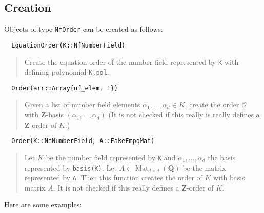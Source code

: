 \documentclass[a4paper,10pt]{article}
\newcommand{\Z}{\mathbf{Z}}
\newcommand{\Q}{\mathbf{Q}}
\newcommand{\code}{\lstinline}
\newcommand{\desc}[1]{\vspace{-3mm}\begin{quote}#1\end{quote}}
\newcommand{\Mat}{\operatorname{Mat}}
\begin{document}
\subsection{Creation}

Objects of type \code{NfOrder} can be created as follows:

\begin{lstlisting}
  EquationOrder(K::NfNumberField)
\end{lstlisting}

\desc{Create the equation order of the number field represented by \code{K} with defining polynomial \code{K.pol}.}

\begin{lstlisting}
  Order(arr::Array{nf_elem, 1})
\end{lstlisting}
  
\desc{Given a list of number field elements $\alpha_1,\dotsc, \alpha_d \in K$, create the order $\mathcal O$ with $\Z$-basis $(\alpha_1,\dotsc,\alpha_d)$ (It is not checked if this really is really defines a $\Z$-order of $K$.)}

\begin{lstlisting}
  Order(K::NfNumberField, A::FakeFmpqMat)
\end{lstlisting}

\desc{Let $K$ be the number field represented by \code{K} and $\alpha_1,\dotsc,\alpha_d$ the basis represented by \code{basis(K)}.
Let $A \in \Mat_{d \times d}(\Q)$ be the matrix represented by \code{A}. Then this function creates the order of $K$ with basis matrix $A$. It is not checked if this really defines a $\Z$-order of $K$.}

Here are some examples:
\end{document}
